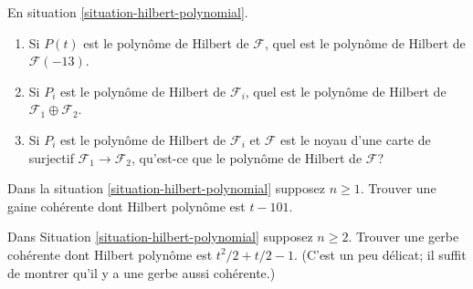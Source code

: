 \begin{exercise}
\label{exercise-hilbert-pol-easy}
En situation \ref{situation-hilbert-polynomial}.
\begin{enumerate}
\item Si $P(t)$ est le polynôme de Hilbert de
$\mathcal{F}$, quel est le polynôme de Hilbert de $\mathcal{F}(-13)$.
\item Si $P_i$ est le polynôme de Hilbert de
$\mathcal{F}_i$, quel est le polynôme de Hilbert de $\mathcal{F}_1 \oplus \mathcal{F}_2$.
\item Si $P_i$ est le polynôme de Hilbert de $\mathcal{F}_i$
et $\mathcal{F}$ est le noyau d'une carte
de surjectif $\mathcal{F}_1 \to \mathcal{F}_2$, qu'est-ce que le polynôme de Hilbert
de $\mathcal{F}$?
\end{enumerate}
\end{exercise}

\begin{exercise}
\label{exercise-find-given-hilbert-pol-dim-1}
Dans la situation \ref{situation-hilbert-polynomial} supposez $n \geq 1$. Trouver une
gaine cohérente dont Hilbert polynôme est $t - 101$.
\end{exercise}

\begin{exercise}
\label{exercise-find-given-hilbert-pol-dim-2}
Dans Situation \ref{situation-hilbert-polynomial} supposez $n \geq 2$. Trouver une gerbe cohérente
dont Hilbert polynôme est $t^2/2 + t/2 -
1$. (C'est un peu délicat; il suffit de
montrer qu'il y a une gerbe aussi cohérente.)
\end{exercise}

